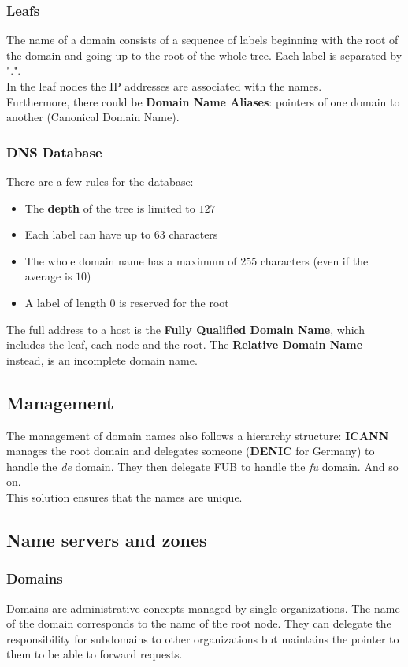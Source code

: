 \subsubsection{Leafs}
The name of a domain consists of a sequence of labels beginning with the root of the domain and going up to the root of the whole tree. Each label is separated by ".".\\
In the leaf nodes the IP addresses are associated with the names.\\
Furthermore, there could be \textbf{Domain Name Aliases}: pointers of one domain to another (Canonical Domain Name).

\subsubsection{DNS Database}
There are a few rules for the database:
\begin{itemize}
	\item The \textbf{depth} of the tree is limited to $127$
	\item Each label can have up to $63$ characters
	\item The whole domain name has a maximum of $255$ characters (even if the average is $10$)
	\item A label of length $0$ is reserved for the root
\end{itemize}
The full address to a host is the \textbf{Fully Qualified Domain Name}, which includes the leaf, each node and the root. The \textbf{Relative Domain Name} instead, is an incomplete domain name.

\subsection{Management}
The management of domain names also follows a hierarchy structure: \textbf{ICANN} manages the root domain and delegates someone (\textbf{DENIC} for Germany) to handle the \textit{de} domain. They then delegate FUB to handle the \textit{fu} domain. And so on.\\
This solution ensures that the names are unique.

\subsection{Name servers and zones}
\subsubsection{Domains}
Domains are administrative concepts managed by single organizations. The name of the domain corresponds to the name of the root node. They can delegate the responsibility for subdomains to other organizations but maintains the pointer to them to be able to forward requests.
